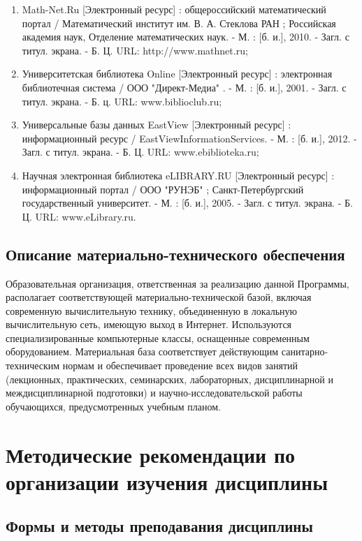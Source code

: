 \documentclass[a4paper, 12pt]{article}
\begin{document}
\begin{enumerate}
    \item Math-Net.Ru [Электронный ресурс] : общероссийский математический портал / Математический институт им. В. А. Стеклова РАН ; Российская академия наук, Отделение математических наук. - М. : [б. и.], 2010. - Загл. с титул. экрана. - Б. Ц. URL: http://www.mathnet.ru;
    \item Университетская библиотека Online [Электронный ресурс] : электронная библиотечная система / ООО "Директ-Медиа" . - М. : [б. и.], 2001. - Загл. с титул. экрана. - Б. ц.  URL: www.biblioclub.ru;
    \item Универсальные базы данных EastView [Электронный ресурс] : информационный ресурс / EastViewInformationServices. - М. : [б. и.], 2012. - Загл. с титул. экрана. - Б. Ц. URL: www.ebiblioteka.ru;
    \item Научная электронная библиотека eLIBRARY.RU [Электронный ресурс] : информационный портал / ООО "РУНЭБ" ; Санкт-Петербургский государственный университет. - М. : [б. и.], 2005. - Загл. с титул. экрана. - Б. Ц. URL: www.eLibrary.ru.
\end{enumerate}

\subsection{Описание материально-технического обеспечения}

Образовательная организация, ответственная за реализацию данной Программы, располагает соответствующей материально-технической базой, включая современную вычислительную технику, объединенную в локальную вычислительную сеть, имеющую выход в Интернет. Используются специализированные компьютерные классы, оснащенные современным оборудованием. Материальная база соответствует действующим санитарно-техническим нормам и обеспечивает проведение всех видов занятий (лекционных, практических, семинарских, лабораторных, дисциплинарной и междисциплинарной подготовки) и научно-исследовательской работы обучающихся, предусмотренных учебным планом.

\section{Методические рекомендации по организации изучения дисциплины}

\subsection{Формы и методы преподавания дисциплины}
\end{document}

